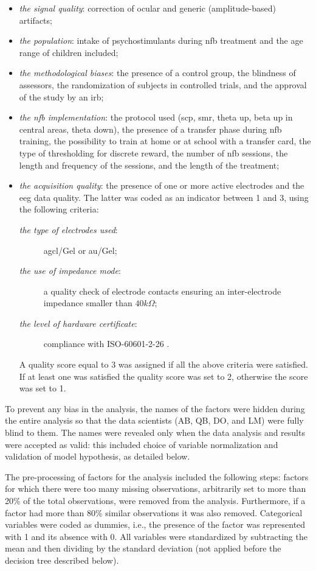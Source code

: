 \begin{itemize}
  \item \emph{the signal quality}: correction of ocular and generic (amplitude-based) artifacts;
  \item \emph{the population}: intake of psychostimulants during \gls{nfb} treatment and the age range of children
  included;
  \item \emph{the methodological biases}: the presence of a control group, the blindness of assessors, 
  the randomization of subjects in controlled trials, and the approval of the study by an \gls{irb};
  \item \emph{the \gls{nfb} implementation}: the protocol used (\gls{scp}, \gls{smr}, 
  theta up, beta up in central areas, theta down), the presence of a transfer phase during \gls{nfb} training, the 
	possibility to train at home or at school with a transfer card, 
  the type of thresholding for discrete reward, the number of \gls{nfb} sessions, the length and frequency of the sessions, and the length of
  the treatment;
  \item \emph{the acquisition quality}: the presence of one or more active electrodes and the \gls{eeg} data quality. 
  The latter was coded as an indicator between 1 and 3, using the following criteria:   
	\begin{description}
	  \item[\emph{the type of electrodes used}:] \gls{agcl}/Gel or \gls{au}/Gel;
    \item[\emph{the use of impedance mode}:] a quality check of electrode contacts
		ensuring an inter-electrode impedance smaller than $40k\Omega$;  
    \item[\emph{the level of hardware certificate}:] compliance with ISO-60601-2-26 \citep{ISO-60601-2-26:2012}.
	\end{description}
	A quality score equal to 3 was assigned if all the above criteria were satisfied. If at least one was satisfied
	the quality score was set to 2, otherwise the score was set to 1.
\end{itemize}	

To prevent any bias in the analysis, the names of the factors were hidden during the entire analysis so that the data scientists (AB, QB,
DO, and LM) were fully blind to them. The names were revealed only when the data analysis and results were accepted as valid: 
this included choice of variable normalization and validation of model hypothesis, as detailed below.

The pre-processing of factors for the analysis included the following steps: factors for which there were too many 
missing observations, arbitrarily set to more than 20\% of the total observations, were removed from the analysis. 
Furthermore, if a factor had more than 80\% similar observations it was also removed. Categorical variables were 
coded as dummies, i.e., the presence of the factor was represented with 1 and its absence with 0. All variables 
were standardized by subtracting the mean and then dividing by the standard deviation (not applied before the decision tree described below).

